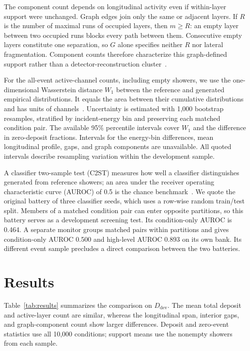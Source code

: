 \documentclass[11pt]{article}
\newcommand{\Ddev}{D_{\mathrm{dev}}}
\begin{document}
The component count depends on longitudinal activity even if within-layer support were unchanged. Graph edges join only the same or adjacent layers. If $R$ is the number of maximal runs of occupied layers, then $m\geq R$: an empty layer between two occupied runs blocks every path between them. Consecutive empty layers constitute one separation, so $G$ alone specifies neither $R$ nor lateral fragmentation. Component counts therefore characterize this graph-defined support rather than a detector-reconstruction cluster~\cite{atlastopocluster}.

For the all-event active-channel counts, including empty showers, we use the one-dimensional Wasserstein distance $W_1$ between the reference and generated empirical distributions. It equals the area between their cumulative distributions and has units of channels~\cite{kansalmetrics}. Uncertainty is estimated with 1,000 bootstrap resamples, stratified by incident-energy bin and preserving each matched condition pair. The available 95\% percentile intervals cover $W_1$ and the difference in zero-deposit fractions. Intervals for the energy-bin differences, mean longitudinal profile, gaps, and graph components are unavailable. All quoted intervals describe resampling variation within the development sample.

A classifier two-sample test (C2ST) measures how well a classifier distinguishes generated from reference showers; an area under the receiver operating characteristic curve (AUROC) of 0.5 is the chance benchmark~\cite{c2st,kansalmetrics}. We quote the original battery of three classifier seeds, which uses a row-wise random train/test split. Members of a matched condition pair can enter opposite partitions, so this battery serves as a development screening test. Its condition-only AUROC is 0.464. A separate monitor groups matched pairs within partitions and gives condition-only AUROC 0.500 and high-level AUROC 0.893 on its own bank. Its different event sample precludes a direct comparison between the two batteries.

\section{Results}
\label{sec:results}

Table~\ref{tab:results} summarizes the comparison on $\Ddev$. The mean total deposit and active-layer count are similar, whereas the longitudinal span, interior gaps, and graph-component count show larger differences. Deposit and zero-event statistics use all 10,000 conditions; support means use the nonempty showers from each sample.
\end{document}
